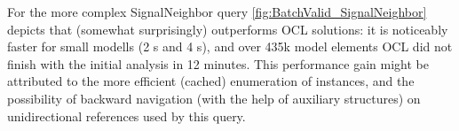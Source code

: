 % 
% 

For the more complex \textsf{SignalNeighbor} query
\autoref{fig:BatchValid_SignalNeighbor} depicts that \incquery{} (somewhat
surprisingly) outperforms OCL solutions: it is noticeably faster for small
modells (2 s and 4 s), and over 435k model elements OCL did not finish with
the initial analysis in 12 minutes. This performance gain might be attributed to
the more efficient (cached) enumeration of instances, and the possibility of
backward navigation (with the help of auxiliary structures) on unidirectional
references used by this query.

